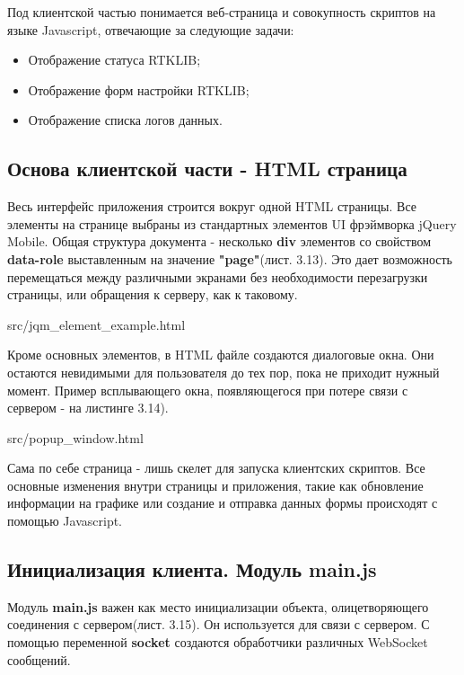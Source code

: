Под клиентской частью понимается веб-страница и совокупность скриптов на языке Javascript, отвечающие за следующие задачи:

\begin{itemize}
  \item Отображение статуса RTKLIB;
  \item Отображение форм настройки RTKLIB;
  \item Отображение списка логов данных.
\end{itemize}

\subsection{Основа клиентской части - HTML страница} \label{subsect3_2_1}

Весь интерфейс приложения строится вокруг одной HTML страницы. Все элементы на странице выбраны из стандартных элементов UI фрэймворка jQuery Mobile. Общая структура документа - несколько \textbf{div} элементов со свойством \textbf{data-role} выставленным на значение \textbf{"page"}(лист. 3.13). Это дает возможность перемещаться между различными экранами без необходимости перезагрузки страницы, или обращения к серверу, как к таковому.


{src/jqm_element_example.html}

Кроме основных элементов, в HTML файле создаются диалоговые окна. Они остаются невидимыми для пользователя до тех пор, пока не приходит нужный момент. Пример всплывающего окна, появляющегося при потере связи с сервером - на листинге 3.14).


{src/popup_window.html}

Сама по себе страница - лишь скелет для запуска клиентских скриптов. Все основные изменения внутри страницы и приложения, такие как обновление информации на графике или создание и отправка данных формы происходят с помощью Javascript.

\subsection{Инициализация клиента. Модуль main.js} \label{subsect3_2_2}

Модуль \textbf{main.js} важен как место инициализации объекта, олицетворяющего соединения с сервером(лист. 3.15). Он используется для связи с сервером. С помощью переменной \textbf{socket} создаются обработчики различных WebSocket сообщений.

